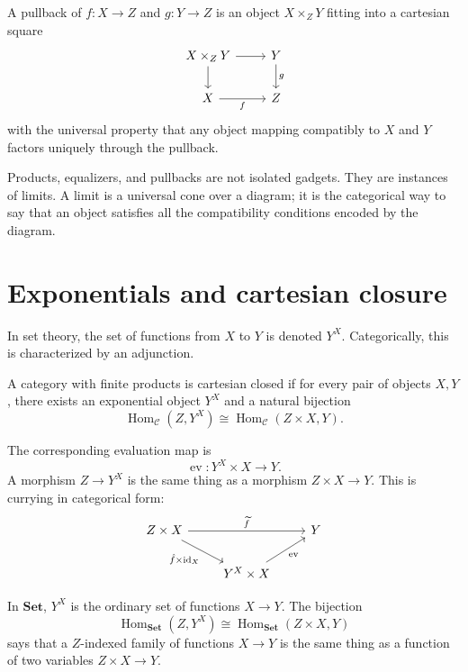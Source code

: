 \begin{definition}
A pullback of \(f:X\to Z\) and \(g:Y\to Z\) is an object \(X\times_ZY\) fitting into a cartesian square
\[
\begin{tikzcd}
X\times_ZY \arrow[r] \arrow[d] & Y \arrow[d,"g"]\\
X \arrow[r,swap,"f"] & Z
\end{tikzcd}
\]
with the universal property that any object mapping compatibly to \(X\) and \(Y\) factors uniquely through the pullback.
\end{definition}

\begin{remark}
Products, equalizers, and pullbacks are not isolated gadgets.  They are instances of limits.  A limit is a universal cone over a diagram; it is the categorical way to say that an object satisfies all the compatibility conditions encoded by the diagram.
\end{remark}

\section{Exponentials and cartesian closure}

In set theory, the set of functions from \(X\) to \(Y\) is denoted \(Y^X\).  Categorically, this is characterized by an adjunction.

\begin{definition}
A category with finite products is cartesian closed if for every pair of objects \(X,Y\), there exists an exponential object \(Y^X\) and a natural bijection
\[
  \operatorname{Hom}_{\mathcal C}(Z,Y^X)
  \cong
  \operatorname{Hom}_{\mathcal C}(Z\times X,Y).
\]
\end{definition}

The corresponding evaluation map is
\[
  \operatorname{ev}:Y^X\times X\to Y.
\]
A morphism \(Z\to Y^X\) is the same thing as a morphism \(Z\times X\to Y\).  This is currying in categorical form:
\[
\begin{tikzcd}
Z\times X \arrow[rr,"\widetilde f"] \arrow[dr,swap,"{\hat f\times\id_X}"] && Y\\
& Y^X\times X \arrow[ur,swap,"\operatorname{ev}"] &
\end{tikzcd}
\]

\begin{example}
In \(\mathbf{Set}\), \(Y^X\) is the ordinary set of functions \(X\to Y\).  The bijection
\[
  \operatorname{Hom}_{\mathbf{Set}}(Z,Y^X)
  \cong
  \operatorname{Hom}_{\mathbf{Set}}(Z\times X,Y)
\]
says that a \(Z\)-indexed family of functions \(X\to Y\) is the same thing as a function of two variables \(Z\times X\to Y\).
\end{example}

